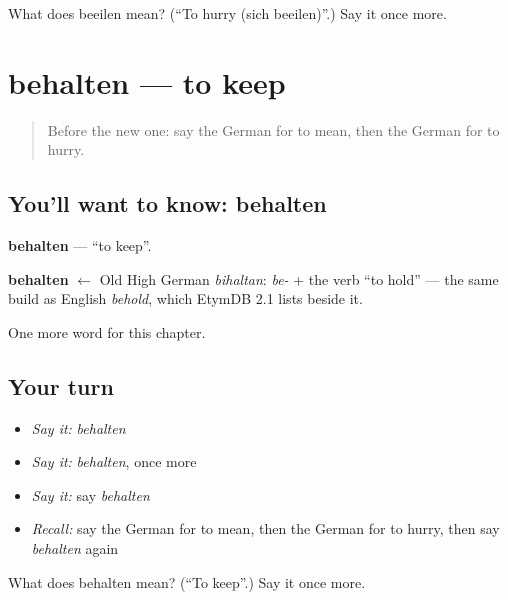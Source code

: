 \begin{tcolorbox}[breakable,colback=teal!4,colframe=teal!35!black,title={Before you move on}]
What does beeilen mean? (\textquotedblleft{}To hurry (sich beeilen)\textquotedblright{}.) Say it once more.
\end{tcolorbox}
\section[behalten]{behalten — to keep}

\label{lesson:GE-C176-behalten}



\begin{quote}
Before the new one: say the German for to mean, then the German for to hurry.
\end{quote}

\subsection*{You'll want to know: behalten}
\textbf{behalten} — \textquotedblleft{}to keep\textquotedblright{}.

\begin{cousinweb}
\textbf{behalten} $\leftarrow$ Old High German \emph{bihaltan}: \emph{be-} + the verb \textquotedblleft{}to hold\textquotedblright{} — the same build as English \emph{behold}, which EtymDB 2.1 lists beside it.
\end{cousinweb}

\begin{grammarlens}[title={What you've built}]
One more word for this chapter.
\end{grammarlens}

\subsection*{Your turn}
\begin{itemize}
\raggedright
  \item \emph{Say it:} \emph{behalten}
  \item \emph{Say it:} \emph{behalten}, once more
  \item \emph{Say it:} say \emph{behalten}
  \item \emph{Recall:} say the German for to mean, then the German for to hurry, then say \emph{behalten} again
\end{itemize}

\begin{tcolorbox}[breakable,colback=teal!4,colframe=teal!35!black,title={Before you move on}]
What does behalten mean? (\textquotedblleft{}To keep\textquotedblright{}.) Say it once more.
\end{tcolorbox}
